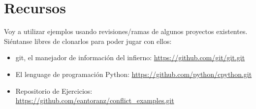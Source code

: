 
\section{Recursos}

Voy a utilizar ejemplos usando revisiones/ramas de algunos proyectos existentes. Siéntanse libres de clonarlos
para poder jugar con ellos:

\begin{itemize}

	\item git, el manejador de información del infierno: \url{https://github.com/git/git.git}
	\label{git_repo}

	\item El lenguage de programación Python: \url{https://github.com/python/cpython.git}
	\label{python_repo}
	
	\item Repositorio de Ejercicios: \url{https://github.com/eantoranz/conflict_examples.git}
	\label{exercises_repo}

\end{itemize}
